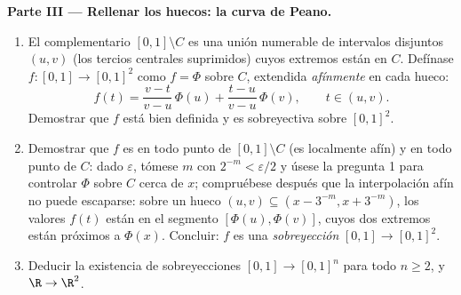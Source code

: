 \begin{problem}
\medskip
\noindent\textbf{Parte III --- Rellenar los huecos: la curva de Peano.}
\begin{enumerate}[resume]
  \item El complementario $[0,1] \setminus C$ es una unión numerable de
  intervalos  disjuntos $(u, v)$ (los tercios centrales
  suprimidos) cuyos extremos están en $C$. Defínase $f \colon
        [0,1] \to [0,1]^2$ como $f = \Phi$ sobre $C$, extendida
  \emph{afínmente} en cada hueco:
        \[
        f(t) = \frac{v - t}{v - u}\,\Phi(u) +
        \frac{t - u}{v - u}\,\Phi(v),
        \qquad t \in (u, v).
        \]
        Demostrar que $f$ está bien definida y es sobreyectiva sobre
        $[0,1]^2$.
  \item Demostrar que $f$ es
   en todo punto de $[0,1]
        \setminus C$ (es localmente afín) y en todo punto de $C$: dado
  $\varepsilon$, tómese $m$ con $2^{-m} <
        \varepsilon/2$ y úsese la pregunta 1 para controlar $\Phi$ sobre
  $C$ cerca de $x$; compruébese después que la interpolación afín no
  puede escaparse: sobre un hueco $(u,v) \subseteq
        (x - 3^{-m}, x + 3^{-m})$, los valores $f(t)$ están en el
  segmento $[\Phi(u), \Phi(v)]$, cuyos dos extremos están próximos a
  $\Phi(x)$. Concluir: $f$ es una \emph{sobreyección
  } $[0,1] \to [0,1]^2$.
  \item Deducir la existencia de sobreyecciones
   $[0,1] \to [0,1]^n$
  para todo $n \geq 2$, y $\R \to \R^2$.
\end{enumerate}


\end{problem}
